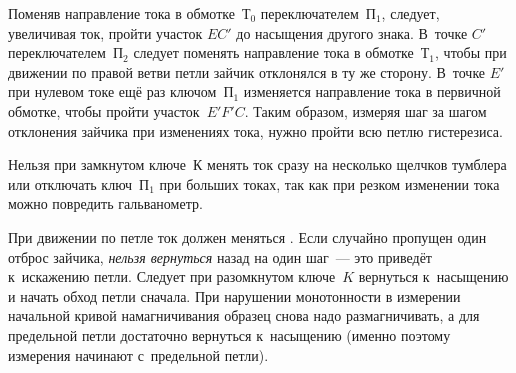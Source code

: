 Поменяв направление тока в обмотке~Т$_0$ переключателем~$\text{П}_1$,
следует, увеличивая ток, пройти участок $EC'$ до
насыщения другого знака. В~точке $C'$ переключателем~$\text{П}_2$ следует
поменять направление тока в обмотке~$Т_{1}$, чтобы при
движении по правой ветви петли зайчик отклонялся в ту же сторону. В~точке $E'$
при нулевом токе ещё раз ключом~$\text{П}_1$
изменяется направление тока в первичной обмотке, чтобы пройти участок~$E'F'C$.
Таким образом, измеряя шаг за шагом
отклонения зайчика при изменениях тока, нужно пройти всю петлю гистерезиса.

Нельзя при замкнутом ключе~К менять ток сразу на несколько щелчков тумблера или
отключать ключ~$\text{П}_1$ при больших токах, так как при резком изменении
тока можно повредить гальванометр.

При движении по петле ток должен меняться .
Если случайно пропущен один отброс зайчика, \emph{нельзя вернуться}
назад на один шаг~--- это приведёт к~искажению петли. Следует при разомкнутом
ключе~$K$ вернуться к~насыщению и начать
обход петли сначала. При нарушении монотонности в измерении начальной кривой
намагничивания образец снова надо размагничивать, а для предельной петли
достаточно вернуться к~насыщению (именно поэтому измерения начинают с~предельной
петли).

